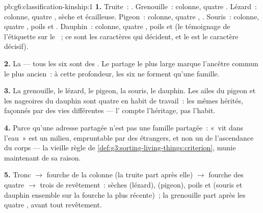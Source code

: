 \begin{solution}{pb:g6:classification-kinship:1}
\textbf{1.} Truite~: . Grenouille~: colonne,
quatre . Lézard~: colonne, quatre ,  sèche et
écailleuse. Pigeon~: colonne, quatre , . Souris~:
colonne, quatre , poils et . Dauphin~: colonne, quatre
, poils et  (le témoignage de l'étiquette sur le ~;
ce sont les caractères qui décident, et le  est le caractère
décisif).

\textbf{2.} La  --- tous les six sont des
. Le partage le plus large marque l'ancêtre commun le plus
ancien~: à cette profondeur, les six ne forment qu'une famille.

\textbf{3.} La grenouille, le lézard, le pigeon, la souris, le
dauphin. Les ailes du pigeon et les nageoires du dauphin sont quatre
 en habit de travail~: les mêmes  hérités, façonnés
par des vies différentes --- l' compte l'héritage, pas l'habit.

\textbf{4.} Parce qu'une adresse partagée n'est pas une famille
partagée~: «~vit dans l'eau~» est un milieu, empruntable par des
étrangers, et non un  de l'ascendance du corps --- la
vieille règle de \cref{def:g3:sorting-living-things:criterion},
munie maintenant de sa raison.

\textbf{5.} Tronc $\rightarrow$ fourche de la colonne (la truite
part après elle) $\rightarrow$ fourche des quatre 
$\rightarrow$ trois  de revêtement~:  sèches
(lézard),  (pigeon), poils et  (souris et dauphin
ensemble sur la fourche la plus récente)~; la grenouille part après
les quatre , avant tout revêtement.


\end{solution}
